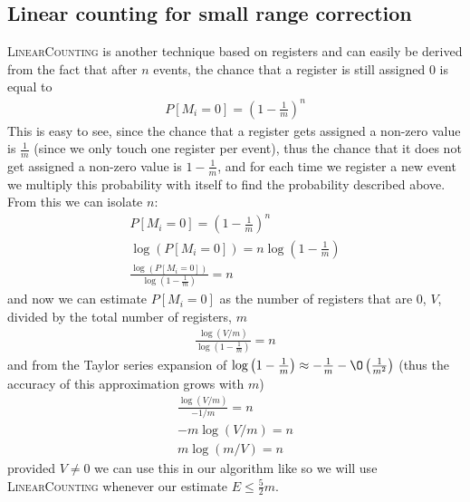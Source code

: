 \subsection{Linear counting for small range correction}
\textsc{LinearCounting} is another technique based on registers and can easily be derived from the fact that after $n$ events, the chance that a register is still assigned 0 is equal to
\begin{equation*}
    \begin{split}
        P[M_i=0]=\left(1-\frac{1}{m}\right)^n
    \end{split}
\end{equation*}
This is easy to see, since the chance that a register gets assigned a non-zero value is $\frac{1}{m}$ (since we only touch one register per event), thus the chance that it does not get assigned a non-zero value is $1-\frac{1}{m}$, and for each time we register a new event we multiply this probability with itself to find the probability described above.
\\
From this we can isolate $n$:
\begin{equation*}
    \begin{split}
        P[M_i=0]=\left(1-\frac{1}{m}\right)^n\\
        \log(P[M_i=0])=n\log\left(1-\frac{1}{m}\right)\\
        \frac{\log(P[M_i=0])}{\log\left(1-\frac{1}{m}\right)}=n
    \end{split}
\end{equation*}
and now we can estimate $P[M_i=0]$ as the number of registers that are 0, $V$, divided by the total number of registers, $m$
\begin{equation*}
    \begin{split}
        \frac{\log(V/m)}{\log\left(1-\frac{1}{m}\right)}=n
    \end{split}
\end{equation*}
and from the Taylor series expansion of $\log\left(1-\frac{1}{m}\right)\approx -\frac{1}{m}-\O\left(\frac{1}{m^2}\right)$ (thus the accuracy of this approximation grows with $m$)
\begin{equation*}
    \begin{split}
        \frac{\log(V/m)}{-1/m}=n\\
        -m\log(V/m)=n\\
        m\log(m/V)=n
    \end{split}
\end{equation*}
provided $V\neq 0$ we can use this in our algorithm like so
we will use \textsc{LinearCounting} whenever our estimate $E\leq \frac{5}{2}m$.
